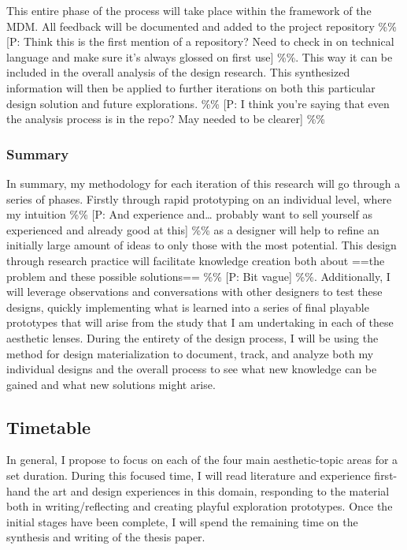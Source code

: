 \documentclass[
]{article}
\begin{document}
This entire phase of the process will take place within the framework of
the MDM. All feedback will be documented and added to the project
repository \%\% {[}P: Think this is the first mention of a repository?
Need to check in on technical language and make sure it's always glossed
on first use{]} \%\%. This way it can be included in the overall
analysis of the design research. This synthesized information will then
be applied to further iterations on both this particular design solution
and future explorations. \%\% {[}P: I think you're saying that even the
analysis process is in the repo? May needed to be clearer{]} \%\%

\subsubsection{Summary}\label{summary}

In summary, my methodology for each iteration of this research will go
through a series of phases. Firstly through rapid prototyping on an
individual level, where my intuition \%\% {[}P: And experience
and\ldots{} probably want to sell yourself as experienced and already
good at this{]} \%\% as a designer will help to refine an initially
large amount of ideas to only those with the most potential. This design
through research practice will facilitate knowledge creation both about
==the problem and these possible solutions== \%\% {[}P: Bit vague{]}
\%\%. Additionally, I will leverage observations and conversations with
other designers to test these designs, quickly implementing what is
learned into a series of final playable prototypes that will arise from
the study that I am undertaking in each of these aesthetic lenses.
During the entirety of the design process, I will be using the method
for design materialization to document, track, and analyze both my
individual designs and the overall process to see what new knowledge can
be gained and what new solutions might arise.

\subsection{Timetable}\label{timetable}

In general, I propose to focus on each of the four main aesthetic-topic
areas for a set duration. During this focused time, I will read
literature and experience first-hand the art and design experiences in
this domain, responding to the material both in writing/reflecting and
creating playful exploration prototypes. Once the initial stages have
been complete, I will spend the remaining time on the synthesis and
writing of the thesis paper.
\end{document}
